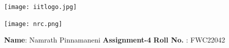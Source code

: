 \documentclass[10pt,a4paper]{report}
\begin{document}
\begin{figure*}[!tbp]
  \centering
  \begin{minipage}[b]{0.4\textwidth}
    \texttt{[image: iitlogo.jpg]}
  \end{minipage}
  \hfill
  \vspace{5mm}\begin{minipage}[b]{0.4\textwidth}
\raggedleft  \texttt{[image: nrc.png]}\

  \end{minipage}\vspace{0.2cm}
\end{figure*}
\raggedright \textbf{Name}:\hspace{1mm} Namrath Pinnamaneni\hspace{3cm} \Large \textbf{Assignment-4}\hspace{2.5cm} %
\normalsize \textbf{Roll No.} :\hspace{1mm} FWC22042\vspace{1cm}
\end{document}
